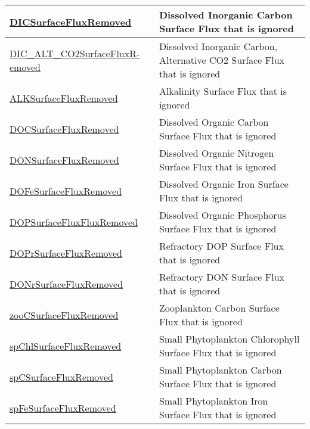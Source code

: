 {\begin{center}
\begin{longtable}{| p{2.0in} | p{4.0in} |}
    \hline
    \hyperref[subsec:var_sec_tracersSurfaceFlux_DICSurfaceFluxRemoved]{DICSurfaceFluxRemoved} & Dissolved Inorganic Carbon Surface Flux that is ignored \\
    \hline
    \hyperref[subsec:var_sec_tracersSurfaceFlux_DIC_ALT_CO2SurfaceFluxRemoved]{DIC\_ALT\_CO2SurfaceFluxR-}\hyperref[subsec:var_sec_tracersSurfaceFlux_DIC_ALT_CO2SurfaceFluxRemoved]{emoved}  & Dissolved Inorganic Carbon, Alternative CO2 Surface Flux that is ignored \\
    \hline
    \hyperref[subsec:var_sec_tracersSurfaceFlux_ALKSurfaceFluxRemoved]{ALKSurfaceFluxRemoved} & Alkalinity Surface Flux that is ignored \\
    \hline
    \hyperref[subsec:var_sec_tracersSurfaceFlux_DOCSurfaceFluxRemoved]{DOCSurfaceFluxRemoved} & Dissolved Organic Carbon Surface Flux that is ignored \\
    \hline
    \hyperref[subsec:var_sec_tracersSurfaceFlux_DONSurfaceFluxRemoved]{DONSurfaceFluxRemoved} & Dissolved Organic Nitrogen Surface Flux that is ignored \\
    \hline
    \hyperref[subsec:var_sec_tracersSurfaceFlux_DOFeSurfaceFluxRemoved]{DOFeSurfaceFluxRemoved} & Dissolved Organic Iron Surface Flux that is ignored \\
    \hline
    \hyperref[subsec:var_sec_tracersSurfaceFlux_DOPSurfaceFluxFluxRemoved]{DOPSurfaceFluxFluxRemoved} & Dissolved Organic Phosphorus Surface Flux that is ignored \\
    \hline
    \hyperref[subsec:var_sec_tracersSurfaceFlux_DOPrSurfaceFluxRemoved]{DOPrSurfaceFluxRemoved} & Refractory DOP Surface Flux that is ignored \\
    \hline
    \hyperref[subsec:var_sec_tracersSurfaceFlux_DONrSurfaceFluxRemoved]{DONrSurfaceFluxRemoved} & Refractory DON Surface Flux that is ignored \\
    \hline
    \hyperref[subsec:var_sec_tracersSurfaceFlux_zooCSurfaceFluxRemoved]{zooCSurfaceFluxRemoved} & Zooplankton Carbon Surface Flux that is ignored \\
    \hline
    \hyperref[subsec:var_sec_tracersSurfaceFlux_spChlSurfaceFluxRemoved]{spChlSurfaceFluxRemoved} & Small Phytoplankton Chlorophyll Surface Flux that is ignored \\
    \hline
    \hyperref[subsec:var_sec_tracersSurfaceFlux_spCSurfaceFluxRemoved]{spCSurfaceFluxRemoved} & Small Phytoplankton Carbon Surface Flux that is ignored \\
    \hline
    \hyperref[subsec:var_sec_tracersSurfaceFlux_spFeSurfaceFluxRemoved]{spFeSurfaceFluxRemoved} & Small Phytoplankton Iron Surface Flux that is ignored \\

\end{longtable}
\end{center}}
